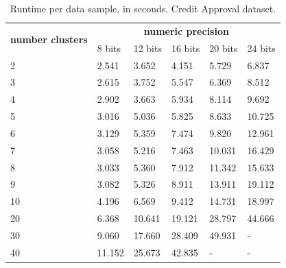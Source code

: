 \begin{table}[H]
\centering
\caption{Runtime per data sample, in seconds. Credit Approval dataset.}
\label{table:runtimeKMCA}
\begin{tabular}{|l|l|l|l|l|l|}
\hline
\multirow{2}{*}{\textbf{number clusters}} & \multicolumn{5}{c|}{\textbf{numeric precision}}                                              \\ \cline{2-6}
                                          & 8 bits & 12 bits & 16 bits & 20 bits & 24 bits \\ \hline
2                                & 2.541           & 3.652            & 4.151            & 5.729            & 6.837            \\ \hline
3                                & 2.615           & 3.752            & 5.547            & 6.369            & 8.512            \\ \hline
4                                & 2.902           & 3.663            & 5.934            & 8.114            & 9.692            \\ \hline
5                                & 3.016           & 5.036            & 5.825            & 8.633            & 10.725           \\ \hline
6                                & 3.129           & 5.359            & 7.474            & 9.820            & 12.961           \\ \hline
7                                & 3.058           & 5.216            & 7.463            & 10.031           & 16.429           \\ \hline
8                                & 3.033           & 5.360            & 7.912            & 11.342           & 15.633           \\ \hline
9                                & 3.082           & 5.326            & 8.911            & 13.911           & 19.112           \\ \hline
10                               & 4.196           & 6.569            & 9.412            & 14.731           & 18.997           \\ \hline
20                               & 6.368           & 10.641           & 19.121           & 28.797           & 44.666           \\ \hline
30                               & 9.060           & 17.660           & 28.409           & 49.931           & -                \\ \hline
40                               & 11.152          & 25.673           & 42.835           & -                & -                \\ \hline

\end{tabular}
\end{table}
